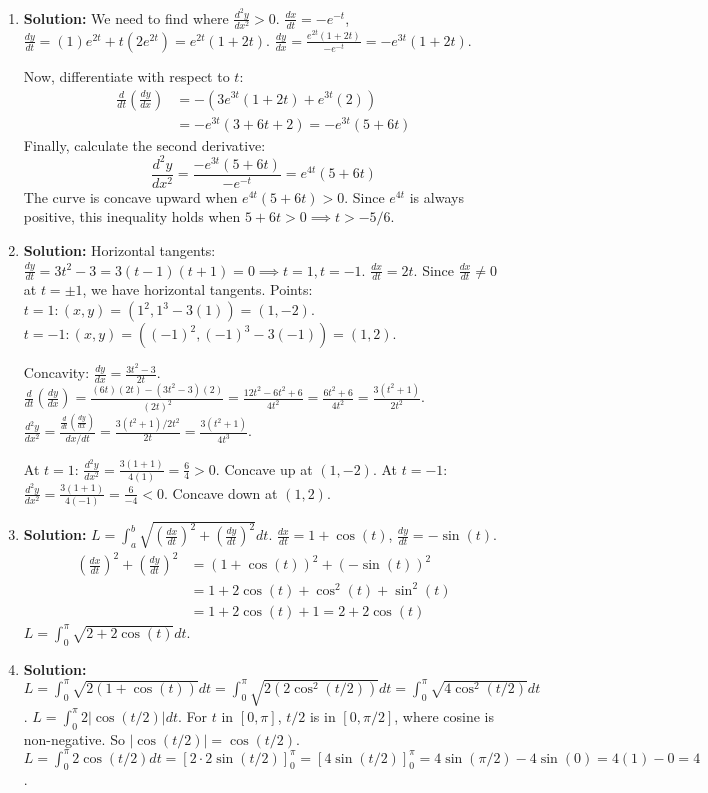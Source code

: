 \documentclass{article}
\begin{document}
\begin{enumerate}
\item \textbf{Solution:} We need to find where $\frac{d^2y}{dx^2} > 0$.
$\frac{dx}{dt} = -e^{-t}$, $\frac{dy}{dt} = (1)e^{2t} + t(2e^{2t}) = e^{2t}(1+2t)$.
$\frac{dy}{dx} = \frac{e^{2t}(1+2t)}{-e^{-t}} = -e^{3t}(1+2t)$.

Now, differentiate with respect to $t$:
\begin{align*}
\frac{d}{dt}\left(\frac{dy}{dx}\right) &= -(3e^{3t}(1+2t) + e^{3t}(2)) \\
&= -e^{3t}(3+6t+2) = -e^{3t}(5+6t)
\end{align*}
Finally, calculate the second derivative:
\[ \frac{d^2y}{dx^2} = \frac{-e^{3t}(5+6t)}{-e^{-t}} = e^{4t}(5+6t) \]
The curve is concave upward when $e^{4t}(5+6t) > 0$. Since $e^{4t}$ is always positive, this inequality holds when $5+6t > 0 \implies t > -5/6$.

\item \textbf{Solution:} Horizontal tangents: $\frac{dy}{dt} = 3t^2 - 3 = 3(t-1)(t+1) = 0 \implies t=1, t=-1$.
$\frac{dx}{dt} = 2t$. Since $\frac{dx}{dt} \neq 0$ at $t=\pm 1$, we have horizontal tangents.
Points:
$t=1: (x,y) = (1^2, 1^3-3(1)) = (1, -2)$.
$t=-1: (x,y) = ((-1)^2, (-1)^3-3(-1)) = (1, 2)$.

Concavity:
$\frac{dy}{dx} = \frac{3t^2-3}{2t}$.
$\frac{d}{dt}(\frac{dy}{dx}) = \frac{(6t)(2t) - (3t^2-3)(2)}{(2t)^2} = \frac{12t^2 - 6t^2 + 6}{4t^2} = \frac{6t^2+6}{4t^2} = \frac{3(t^2+1)}{2t^2}$.
$\frac{d^2y}{dx^2} = \frac{\frac{d}{dt}(\frac{dy}{dx})}{dx/dt} = \frac{3(t^2+1)/2t^2}{2t} = \frac{3(t^2+1)}{4t^3}$.

At $t=1$: $\frac{d^2y}{dx^2} = \frac{3(1+1)}{4(1)} = \frac{6}{4} > 0$. Concave up at $(1,-2)$.
At $t=-1$: $\frac{d^2y}{dx^2} = \frac{3(1+1)}{4(-1)} = \frac{6}{-4} < 0$. Concave down at $(1,2)$.


\item \textbf{Solution:} $L = \int_a^b \sqrt{(\frac{dx}{dt})^2 + (\frac{dy}{dt})^2} dt$.
$\frac{dx}{dt} = 1 + \cos(t)$, $\frac{dy}{dt} = -\sin(t)$.
\begin{align*}
(\frac{dx}{dt})^2 + (\frac{dy}{dt})^2 &= (1+\cos(t))^2 + (-\sin(t))^2 \\
&= 1 + 2\cos(t) + \cos^2(t) + \sin^2(t) \\
&= 1 + 2\cos(t) + 1 = 2 + 2\cos(t)
\end{align*}
$L = \int_0^\pi \sqrt{2+2\cos(t)} dt$.

\item \textbf{Solution:}
$L = \int_0^\pi \sqrt{2(1+\cos(t))} dt = \int_0^\pi \sqrt{2(2\cos^2(t/2))} dt = \int_0^\pi \sqrt{4\cos^2(t/2)} dt$.
$L = \int_0^\pi 2|\cos(t/2)| dt$.
For $t$ in $[0, \pi]$, $t/2$ is in $[0, \pi/2]$, where cosine is non-negative. So $|\cos(t/2)| = \cos(t/2)$.
$L = \int_0^\pi 2\cos(t/2) dt = [2 \cdot 2\sin(t/2)]_0^\pi = [4\sin(t/2)]_0^\pi = 4\sin(\pi/2) - 4\sin(0) = 4(1) - 0 = 4$.


\end{enumerate}
\end{document}
